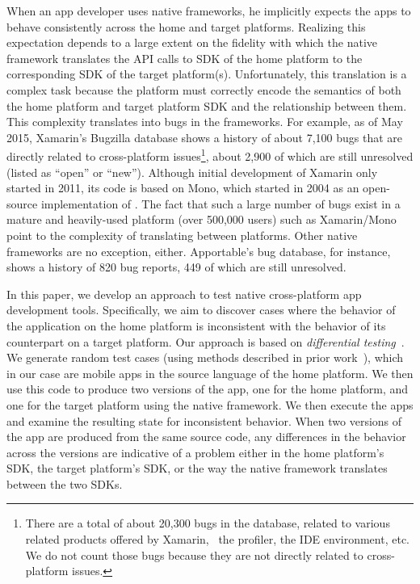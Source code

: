 When an app developer uses native frameworks, he implicitly expects the apps to
behave consistently across the home and target platforms. Realizing this
expectation depends to a large extent on the fidelity with which the native
framework translates the API calls to SDK of the home platform to the
corresponding SDK of the target platform(s). Unfortunately, this translation is
a complex task because the platform must correctly encode the semantics of both
the home platform and target platform SDK and the relationship between them.
This complexity translates into bugs in the frameworks. For example, as of May
2015, Xamarin's Bugzilla database shows a history of about 7,100 bugs that are
directly related to cross-platform issues\footnote{There are a total of about
20,300 bugs in the database, related to various related products offered by
Xamarin, \eg~the profiler, the IDE environment, etc. We do not count those bugs
because they are not directly related to cross-platform issues.}, about 2,900
of which are still unresolved (listed as ``open'' or ``new''). Although initial
development of Xamarin only started in 2011, its code is based on Mono, which
started in 2004 as an open-source implementation of .  The fact that
such a large number of bugs exist in a mature and heavily-used platform (over
500,000 users) such as Xamarin/Mono point to the complexity of translating
between platforms. Other native frameworks are no exception, either.
Apportable's bug database, for instance, shows a history of 820 bug reports,
449 of which are still unresolved.


In this paper, we develop an approach to test native cross-platform app
development tools. Specifically, we aim to discover cases where the behavior of
the application on the home platform is inconsistent with the behavior of its
counterpart on a target platform. Our approach is based on \textit{differential
testing}~\cite{mckeeman:difftest:1998}. We generate random test cases (using
methods described in prior work~\cite{randoop:icse07}), which in our case are
mobile apps in the source language of the home platform. We then use this code
to produce two versions of the app, one for the home platform, and one for the
target platform using the native framework. We then execute the apps and
examine the resulting state for inconsistent behavior.  When two versions of
the app are produced from the same source code, any differences in the behavior
across the versions are indicative of a problem either in the home platform's
SDK, the target platform's SDK, or the way the native framework translates
between the two SDKs.

